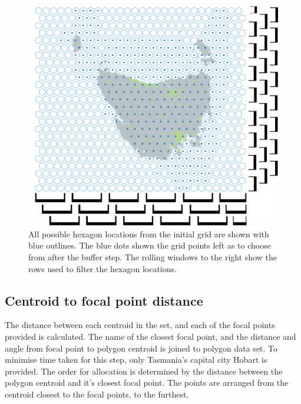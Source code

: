 \documentclass[
]{jss}
\begin{document}
\begin{CodeChunk}
\begin{figure}

{\centering \includegraphics[width=1\linewidth]{figures/3grid} 

}

\caption[All possible hexagon locations from the initial grid are shown with blue outlines]{All possible hexagon locations from the initial grid are shown with blue outlines. The blue dots shown the grid points left as to choose from after the buffer step. The rolling windows to the right show the rows used to filter the hexagon locations.}\label{fig:filter_grid}
\end{figure}
\end{CodeChunk}

\hypertarget{centroid-to-focal-point-distance}{%
\subsection{Centroid to focal point
distance}\label{centroid-to-focal-point-distance}}

The distance between each centroid in the set, and each of the focal
points provided is calculated. The name of the closest focal point, and
the distance and angle from focal point to polygon centroid is joined to
polygon data set. To minimise time taken for this step, only Tasmania's
capital city Hobart is provided. The order for allocation is determined
by the distance between the polygon centroid and it's closest focal
point. The points are arranged from the centroid closest to the focal
points, to the furthest.
\end{document}

